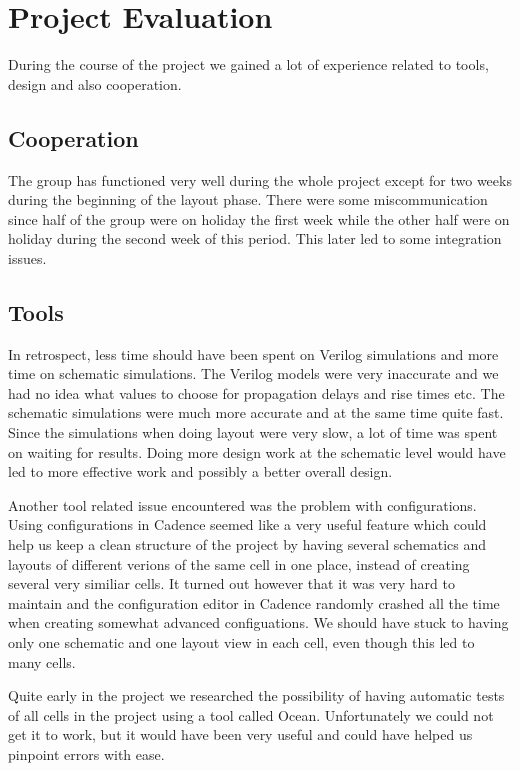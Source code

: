 \section{Project Evaluation} \label{sec:evaluation}
During the course of the project we gained a lot of experience related to tools, design and also cooperation. 

\subsection{Cooperation} \label{sec:eval_coop}
The group has functioned very well during the whole project except for two weeks during the beginning of the layout phase. There were some miscommunication since half of the group were on holiday the first week while the other half were on holiday during the second week of this period. This later led to some integration issues.

\subsection{Tools}
In retrospect, less time should have been spent on Verilog simulations and more time on schematic simulations. The Verilog models were very inaccurate and we had no idea what values to choose for propagation delays and rise times etc. The schematic simulations were much more accurate and at the same time quite fast. Since the simulations when doing layout were very slow, a lot of time was spent on waiting for results. Doing more design work at the schematic level would have led to more effective work and possibly a better overall design.

Another tool related issue encountered was the problem with configurations. Using configurations in Cadence seemed like a very useful feature which could help us keep a clean structure of the project by having several schematics and layouts of different verions of the same cell in one place, instead of creating several very similiar cells. It turned out however that it was very hard to maintain and the configuration editor in Cadence randomly crashed all the time when creating somewhat advanced configuations. We should have stuck to having only one schematic and one layout view in each cell, even though this led to many cells.

Quite early in the project we researched the possibility of having automatic tests of all cells in the project using a tool called Ocean. Unfortunately we could not get it to work, but it would have been very useful and could have helped us pinpoint errors with ease.

